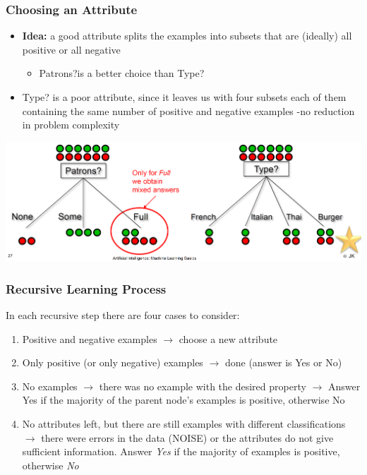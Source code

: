 \documentclass[conference, a4paper]{styles/acmsiggraph}
\begin{document}
        \subsubsection{Choosing an Attribute}
            \begin{itemize}
                \item \textbf{Idea:} a good attribute splits the examples into subsets that are (ideally) all positive or all negative
                \begin{itemize}
                    \item Patrons?is a better choice than Type?
                \end{itemize}
                \item Type? is a poor attribute, since it leaves us with four subsets each of them containing the same number of positive and negative examples -no reduction in problem complexity
            \end{itemize}
            \includegraphics[width=1\textwidth]{imgs/ChoosingAnAttribute.png}\newline

\newpage

        \subsubsection{Recursive Learning Process}
            In each recursive step there are four cases to consider:
            \begin{enumerate}
                \item Positive and negative examples\newline
                $\rightarrow$ choose a new attribute
                \item Only positive (or only negative) examples\newline
                $\rightarrow$ done (answer is Yes or No)
                \item No examples\newline
                $\rightarrow$ there was no example with the desired property\newline 
                $\rightarrow$ Answer Yes if the majority of the parent node's examples is positive, otherwise No
                \item No attributes left, but there are still examples with different classifications\newline
                $\rightarrow$ there were errors in the data (NOISE) or the attributes do not give sufficient information. Answer \textit{Yes} if the majority of examples is positive, otherwise \textit{No}
            \end{enumerate}
        
\end{document}
